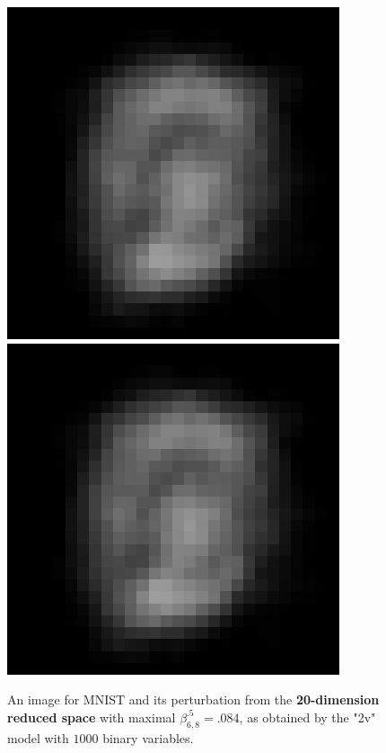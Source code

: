 \begin{figure}[t!]
	\centering
\includegraphics[scale=0.5]{redimage.png} \hspace{1.5cm}
\includegraphics[scale=0.5]{redperturb.png}
\caption{An image for MNIST and its perturbation from the {\bf 20-dimension reduced space} with maximal $\beta^{.5}_{6,8}=.084$, as obtained by the "2v" model with $1000$ binary variables.}
\label{fig4}
\end{figure}	


